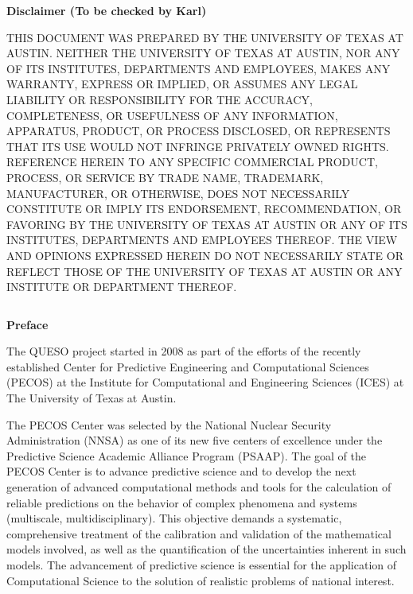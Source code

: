 \clearpage
\centerline{\Large\bf Disclaimer (To be checked by Karl)}
$~$\\
    THIS DOCUMENT WAS PREPARED
    BY THE UNIVERSITY OF TEXAS AT AUSTIN.
    NEITHER THE UNIVERSITY OF TEXAS
    AT AUSTIN, NOR ANY OF ITS INSTITUTES, DEPARTMENTS AND EMPLOYEES, MAKES ANY WARRANTY, EXPRESS OR IMPLIED,
    OR ASSUMES ANY LEGAL LIABILITY OR RESPONSIBILITY FOR THE ACCURACY, COMPLETENESS, OR
    USEFULNESS OF ANY INFORMATION, APPARATUS, PRODUCT, OR PROCESS DISCLOSED, OR REPRESENTS
    THAT ITS USE WOULD NOT INFRINGE PRIVATELY OWNED RIGHTS. REFERENCE HEREIN TO ANY SPECIFIC
    COMMERCIAL PRODUCT, PROCESS, OR SERVICE BY TRADE NAME, TRADEMARK, MANUFACTURER, OR OTHERWISE,
    DOES NOT NECESSARILY CONSTITUTE OR IMPLY ITS ENDORSEMENT, RECOMMENDATION, OR FAVORING BY
    THE UNIVERSITY OF TEXAS AT AUSTIN OR ANY OF ITS INSTITUTES, DEPARTMENTS AND EMPLOYEES THEREOF.
    THE VIEW AND OPINIONS EXPRESSED HEREIN DO NOT NECESSARILY STATE OR REFLECT
    THOSE OF THE UNIVERSITY OF TEXAS AT AUSTIN OR ANY INSTITUTE OR DEPARTMENT
    THEREOF.

\clearpage
$~$\\

\clearpage
{\markboth{}{}
}
\tableofcontents


\clearpage
\thispagestyle{empty}
\centerline{\Large\bf Preface}
$~$\\
The QUESO project started in 2008 as part
of the efforts of the recently established Center for Predictive Engineering and Computational Sciences (PECOS)
at the Institute for Computational and Engineering Sciences (ICES) at The University of Texas at Austin.

The PECOS Center was selected by the National Nuclear Security Administration (NNSA) as one of its new five centers of excellence
under the Predictive Science Academic Alliance Program (PSAAP).
The goal of the PECOS Center is
to advance predictive science and to develop the next generation of advanced computational methods and tools
for the calculation of reliable predictions on the behavior of complex phenomena and systems (multiscale, multidisciplinary).
This objective demands a systematic, comprehensive treatment of the calibration and validation of the mathematical models involved,
as well as the quantification of the uncertainties inherent in such models.
The advancement of predictive science is essential for the application of Computational Science to the solution of realistic problems of national interest.

